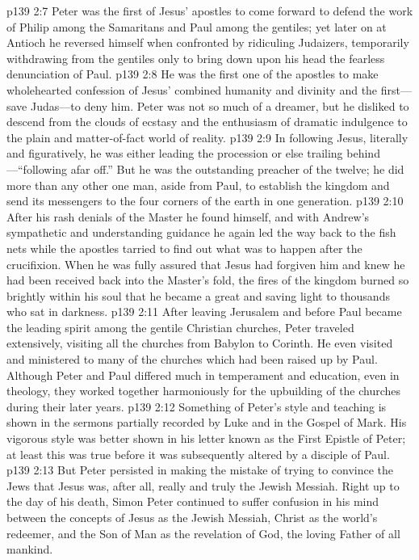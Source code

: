 \vs p139 2:7 Peter was the first of Jesus’ apostles to come forward to defend the work of Philip among the Samaritans and Paul among the gentiles; yet later on at Antioch he reversed himself when confronted by ridiculing Judaizers, temporarily withdrawing from the gentiles only to bring down upon his head the fearless denunciation of Paul.
\vs p139 2:8 He was the first one of the apostles to make wholehearted confession of Jesus’ combined humanity and divinity and the first---save Judas---to deny him. Peter was not so much of a dreamer, but he disliked to descend from the clouds of ecstasy and the enthusiasm of dramatic indulgence to the plain and matter\hyp{}of\hyp{}fact world of reality.
\vs p139 2:9 In following Jesus, literally and figuratively, he was either leading the procession or else trailing behind---“following afar off.” But he was the outstanding preacher of the twelve; he did more than any other one man, aside from Paul, to establish the kingdom and send its messengers to the four corners of the earth in one generation.
\vs p139 2:10 After his rash denials of the Master he found himself, and with Andrew’s sympathetic and understanding guidance he again led the way back to the fish nets while the apostles tarried to find out what was to happen after the crucifixion. When he was fully assured that Jesus had forgiven him and knew he had been received back into the Master’s fold, the fires of the kingdom burned so brightly within his soul that he became a great and saving light to thousands who sat in darkness.
\pc \vs p139 2:11 After leaving Jerusalem and before Paul became the leading spirit among the gentile Christian churches, Peter traveled extensively, visiting all the churches from Babylon to Corinth. He even visited and ministered to many of the churches which had been raised up by Paul. Although Peter and Paul differed much in temperament and education, even in theology, they worked together harmoniously for the upbuilding of the churches during their later years.\plusone
\pc \vs p139 2:12 Something of Peter’s style and teaching is shown in the sermons partially recorded by Luke and in the Gospel of Mark. His vigorous style was better shown in his letter known as the First Epistle of Peter; at least this was true before it was subsequently altered by a disciple of Paul.
\vs p139 2:13 But Peter persisted in making the mistake of trying to convince the Jews that Jesus was, after all, really and truly the Jewish Messiah. Right up to the day of his death, Simon Peter continued to suffer confusion in his mind between the concepts of Jesus as the Jewish Messiah, Christ as the world’s redeemer, and the Son of Man as the revelation of God, the loving Father of all mankind.
